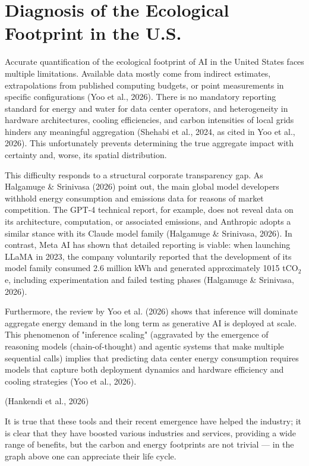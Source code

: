 \documentclass[conference]{IEEEtran}
\begin{document}
\section{Diagnosis of the Ecological Footprint in the U.S.}

Accurate quantification of the ecological footprint of AI in the United States faces multiple limitations. Available data mostly come from indirect estimates, extrapolations from published computing budgets, or point measurements in specific configurations (Yoo et al., 2026). There is no mandatory reporting standard for energy and water for data center operators, and heterogeneity in hardware architectures, cooling efficiencies, and carbon intensities of local grids hinders any meaningful aggregation (Shehabi et al., 2024, as cited in Yoo et al., 2026). This unfortunately prevents determining the true aggregate impact with certainty and, worse, its spatial distribution.

This difficulty responds to a structural corporate transparency gap. As Halgamuge \& Srinivasa (2026) point out, the main global model developers withhold energy consumption and emissions data for reasons of market competition. The GPT-4 technical report, for example, does not reveal data on its architecture, computation, or associated emissions, and Anthropic adopts a similar stance with its Claude model family (Halgamuge \& Srinivasa, 2026). In contrast, Meta AI has shown that detailed reporting is viable: when launching LLaMA in 2023, the company voluntarily reported that the development of its model family consumed 2.6 million kWh and generated approximately 1015 tCO$_2$e, including experimentation and failed testing phases (Halgamuge \& Srinivasa, 2026).

Furthermore, the review by Yoo et al. (2026) shows that inference will dominate aggregate energy demand in the long term as generative AI is deployed at scale. This phenomenon of "inference scaling" (aggravated by the emergence of reasoning models (chain-of-thought) and agentic systems that make multiple sequential calls) implies that predicting data center energy consumption requires models that capture both deployment dynamics and hardware efficiency and cooling strategies (Yoo et al., 2026).

(Hankendi et al., 2026)

It is true that these tools and their recent emergence have helped the industry; it is clear that they have boosted various industries and services, providing a wide range of benefits, but the carbon and energy footprints are not trivial — in the graph above one can appreciate their life cycle.
\end{document}
